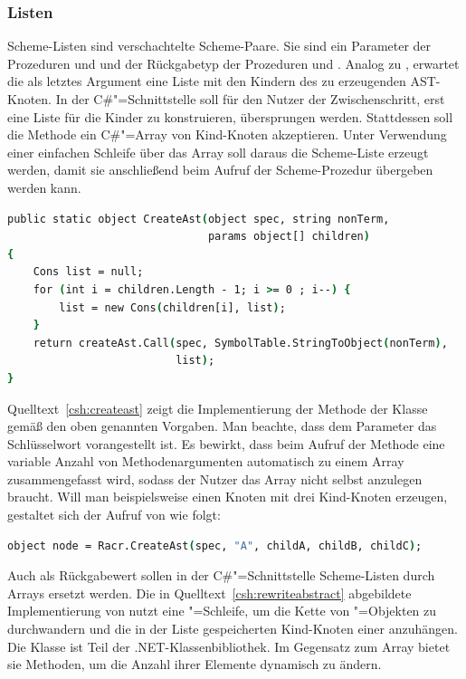 \subsubsection{Listen}

Scheme-Listen sind verschachtelte Scheme-Paare. Sie sind ein Parameter der Prozeduren  und  und der Rückgabetyp der Prozeduren  und . Analog zu , erwartet die  als letztes Argument eine Liste mit den Kindern des zu erzeugenden AST-Knoten. In der C\#"=Schnittstelle soll für den Nutzer der Zwischenschritt, erst eine Liste für die Kinder zu konstruieren, übersprungen werden. Stattdessen soll die Methode  ein C\#"=Array von Kind-Knoten akzeptieren. Unter Verwendung einer einfachen Schleife über das Array soll daraus die Scheme-Liste erzeugt werden, damit sie anschließend beim Aufruf der Scheme-Prozedur übergeben werden kann.

\begin{lstlisting}[language=csh, caption={Listenkonstruktion in \csh{CreateAst}}, label=csh:createast]
public static object CreateAst(object spec, string nonTerm,
							   params object[] children)
{
	Cons list = null;
	for (int i = children.Length - 1; i >= 0 ; i--) {
		list = new Cons(children[i], list);
	}
	return createAst.Call(spec, SymbolTable.StringToObject(nonTerm),
						  list);
}

\end{lstlisting}

Quelltext~\ref{csh:createast} zeigt die Implementierung der Methode  der Klasse  gemäß den oben genannten Vorgaben. Man beachte, dass dem Parameter  das Schlüsselwort  vorangestellt ist. Es bewirkt, dass beim Aufruf der Methode eine variable Anzahl von Methodenargumenten automatisch zu einem Array zusammengefasst wird, sodass der Nutzer das Array nicht selbst anzulegen braucht. Will man beispielsweise einen Knoten mit drei Kind-Knoten erzeugen, gestaltet sich der Aufruf von  wie folgt:

\begin{lstlisting}[language=csh, numbers=none]
object node = Racr.CreateAst(spec, "A", childA, childB, childC);
\end{lstlisting}

Auch als Rückgabewert sollen in der C\#"=Schnittstelle Scheme-Listen durch Arrays ersetzt werden. Die in Quelltext~\ref{csh:rewriteabstract} abgebildete Implementierung von  nutzt eine "=Schleife, um die Kette von "=Objekten zu durchwandern und die in der Liste gespeicherten Kind-Knoten einer  anzuhängen. Die Klasse  ist Teil der .NET-Klassenbibliothek. Im Gegensatz zum Array bietet sie Methoden, um die Anzahl ihrer Elemente dynamisch zu ändern.

